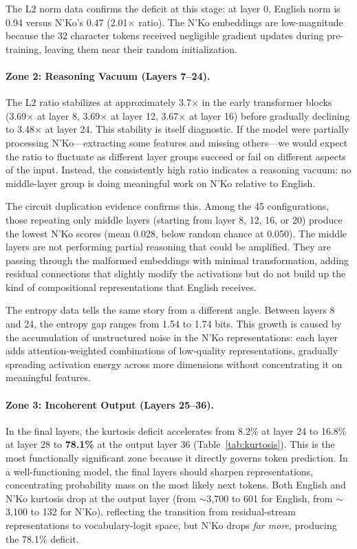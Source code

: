 \documentclass[11pt]{article}
\begin{document}
The L2 norm data confirms the deficit at this stage: at layer 0, English norm is 0.94 versus N'Ko's 0.47 (2.01$\times$ ratio).
The N'Ko embeddings are low-magnitude because the 32 character tokens received negligible gradient updates during pre-training, leaving them near their random initialization.

\paragraph{Zone 2: Reasoning Vacuum (Layers 7--24).}
The L2 ratio stabilizes at approximately 3.7$\times$ in the early transformer blocks (3.69$\times$ at layer 8, 3.69$\times$ at layer 12, 3.67$\times$ at layer 16) before gradually declining to 3.48$\times$ at layer 24.
This stability is itself diagnostic.
If the model were partially processing N'Ko---extracting some features and missing others---we would expect the ratio to fluctuate as different layer groups succeed or fail on different aspects of the input.
Instead, the consistently high ratio indicates a reasoning vacuum: no middle-layer group is doing meaningful work on N'Ko relative to English.

The circuit duplication evidence confirms this.
Among the 45 configurations, those repeating only middle layers (starting from layer 8, 12, 16, or 20) produce the lowest N'Ko scores (mean 0.028, below random chance at 0.050).
The middle layers are not performing partial reasoning that could be amplified.
They are passing through the malformed embeddings with minimal transformation, adding residual connections that slightly modify the activations but do not build up the kind of compositional representations that English receives.

The entropy data tells the same story from a different angle.
Between layers 8 and 24, the entropy gap ranges from 1.54 to 1.74 bits.
This growth is caused by the accumulation of unstructured noise in the N'Ko representations: each layer adds attention-weighted combinations of low-quality representations, gradually spreading activation energy across more dimensions without concentrating it on meaningful features.

\paragraph{Zone 3: Incoherent Output (Layers 25--36).}
In the final layers, the kurtosis deficit accelerates from 8.2\% at layer 24 to 16.8\% at layer 28 to \textbf{78.1\%} at the output layer 36 (Table~\ref{tab:kurtosis}).
This is the most functionally significant zone because it directly governs token prediction.
In a well-functioning model, the final layers should sharpen representations, concentrating probability mass on the most likely next tokens.
Both English and N'Ko kurtosis drop at the output layer (from $\sim$3,700 to 601 for English, from $\sim$3,100 to 132 for N'Ko), reflecting the transition from residual-stream representations to vocabulary-logit space, but N'Ko drops \emph{far more}, producing the 78.1\% deficit.
\end{document}
